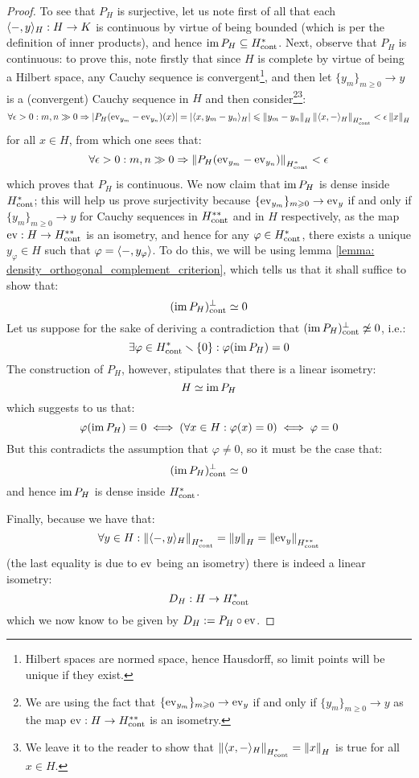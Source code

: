 \begin{proof}
                To see that $P_H$ is surjective, let us note first of all that each $\langle-, y\rangle_H: H \to K$ is continuous by virtue of being bounded (which is per the definition of inner products), and hence $\operatorname{im} P_H \subseteq H^*_{\mathrm{cont}}$. Next, observe that $P_H$ is continuous: to prove this, note firstly that since $H$ is complete by virtue of being a Hilbert space, any Cauchy sequence is convergent\footnote{Hilbert spaces are normed space, hence Hausdorff, so limit points will be unique if they exist.}, and then let $\{y_m\}_{m \geq 0} \to y$ is a (convergent) Cauchy sequence in $H$ and then consider\footnote{We are using the fact that $\{\mathrm{ev}_{y_m}\}_{m \geqslant 0} \to \mathrm{ev}_y$ if and only if $\{y_m\}_{m \geq 0} \to y$ as the map $\mathrm{ev}: H \to H^{**}_{\mathrm{cont}}$ is an isometry.}\footnote{We leave it to the reader to show that $\left\| { \langle x, -\rangle_H } \right\|_{H^*_{\mathrm{cont}}} = \left\| {x} \right\|_H$ is true for all $x \in H$.}:
                    $$\forall \epsilon > 0: m, n \gg 0 \Rightarrow \left\lvert {P_H(\mathrm{ev}_{y_m} - \mathrm{ev}_{y_n})(x)} \right\rvert = \left\lvert { \langle x, y_m - y_n \rangle_H } \right\rvert \leqslant \left\| {y_m - y_n} \right\|_H \left\| { \langle x, -\rangle_H } \right\|_{H^*_{\mathrm{cont}}} < \epsilon \left\| {x} \right\|_H$$
                for all $x \in H$, from which one sees that:
                    $$\forall \epsilon > 0: m, n \gg 0 \Rightarrow \left\| { P_H(\mathrm{ev}_{y_m} - \mathrm{ev}_{y_n}) } \right\|_{H^*_{\mathrm{cont}}} < \epsilon$$
                which proves that $P_H$ is continuous. We now claim that $\operatorname{im} P_H$ is dense inside $H^*_{\mathrm{cont}}$; this will help us prove surjectivity because $\{\mathrm{ev}_{y_m}\}_{m \geqslant 0} \to \mathrm{ev}_y$ if and only if $\{y_m\}_{m \geq 0} \to y$ for Cauchy sequences in $H^{**}_{\mathrm{cont}}$ and in $H$ respectively, as the map $\mathrm{ev}: H \to H^{**}_{\mathrm{cont}}$ is an isometry, and hence for any $\varphi \in H^*_{\mathrm{cont}}$, there exists a unique $y_{\varphi} \in H$ such that $\varphi = \langle-, y_{\varphi}\rangle$. To do this, we will be using lemma \ref{lemma: density_orthogonal_complement_criterion}, which tells us that it shall suffice to show that:
                    $$(\operatorname{im} P_H)^{\perp}_{\mathrm{cont}} \simeq 0$$
                Let us suppose for the sake of deriving a contradiction that $(\operatorname{im} P_H)^{\perp}_{\mathrm{cont}} \not \simeq 0$, i.e.:
                    $$\exists \varphi \in H^*_{\mathrm{cont}} \smallsetminus \{0\}: \varphi(\operatorname{im} P_H) = 0$$
                The construction of $P_H$, however, stipulates that there is a linear isometry:
                    $$H \simeq \operatorname{im} P_H$$
                which suggests to us that:
                    $$\varphi(\operatorname{im} P_H) = 0 \iff (\forall x \in H: \varphi(x) = 0) \iff \varphi = 0$$
                But this contradicts the assumption that $\varphi \not = 0$, so it must be the case that:
                    $$(\operatorname{im} P_H)^{\perp}_{\mathrm{cont}} \simeq 0$$
                and hence $\operatorname{im} P_H$ is dense inside $H^*_{\mathrm{cont}}$.

                Finally, because we have that:
                    $$\forall y \in H: \left\| { \langle-, y\rangle_H } \right\|_{H^*_{\mathrm{cont}}} = \left\| {y} \right\|_H = \left\| {\mathrm{ev}_y} \right\|_{H^{**}_{\mathrm{cont}}}$$
                (the last equality is due to $\mathrm{ev}$ being an isometry) there is indeed a linear isometry:
                    $$D_H: H \to H^*_{\mathrm{cont}}$$
                which we now know to be given by $D_H := P_H \circ \mathrm{ev}$. 
            \end{proof}
